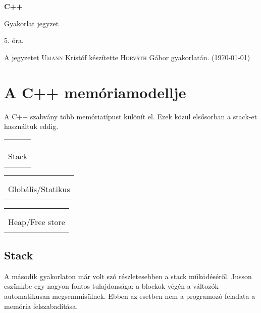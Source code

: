 \documentclass[a4paper,11.5pt,table]{article}
\begin{document}
	\setlength\parindent{0pt}
	\def\<{<\hspace{0mm}<}
	
	\theoremstyle{definition}
	\newtheorem{note}{Megjegyzés}[subsection]
	
	\begin{center}
		{\LARGE\textbf{C++}}
		
		{\Large Gyakorlat jegyzet}
		
		5. óra.
	\end{center}
	A jegyzetet \textsc{Umann} Kristóf készítette \textsc{Horváth} Gábor gyakorlatán. (\today)
	\section{A C++ memóriamodellje}
	A C++ szabvány több memóriatípust különít el. Ezek közül elsősorban a stack-et használtuk eddig.
	\begin{center}
		\begin{tabular}{|c|}
			\\
			\\
			\\
			\\
			Stack\\
			\\
			\hline
		\end{tabular}\quad 
		\begin{tabular}{|c|}
			\hline
			\quad \quad \\
			\\
			Globális/Statikus\\
			\\
			\hline
		\end{tabular}\quad 
		\begin{tabular}{|c|}
			\hline
			\quad \quad \\
			\\
			Heap/Free store\\
			\\
			\hline
		\end{tabular}
	\end{center}
	\subsection{Stack}
	A második gyakorlaton már volt szó részletesebben a stack működéséről. Jusson eszünkbe egy nagyon fontos tulajdonsága: a blockok végén a változók automatikusan megsemmisülnek. Ebben az esetben nem a programozó feladata a memória felszabadítása.
	\smallskip
	
\end{document}
